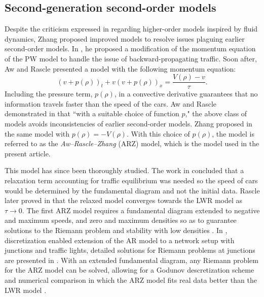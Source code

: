 \documentclass[preprint]{elsarticle}
\begin{document}
\subsection{Second-generation second-order models}
Despite the criticism expressed in \cite{Dag_requiem} regarding higher-order models inspired by fluid dynamics, Zhang proposed improved models to resolve issues plaguing earlier second-order models. In \cite{Zhang1998}, he proposed a modification of the momentum equation of the PW model to handle the issue of backward-propagating traffic.
Soon after, Aw and Rascle \cite{AR} presented a model with the following momentum equation:
\begin{equation} \label{ARZEq}
(v+p(\rho))_t+v(v+p(\rho))_x=\frac{V(\rho)-v}{\tau}.
\end{equation}
Including the pressure term, $p(\rho)$, in a convective derivative guarantees that no information travels faster than the speed of the cars. Aw and Rascle demonstrated in \cite{AR} that ``with a suitable choice of function $p$," the above class of models avoids inconsistencies of earlier second-order models. Zhang proposed in \cite{Z} the same model with $p(\rho) = -V(\rho)$. With this choice of $p(\rho)$, the model is referred to as the \textit{Aw--Rascle--Zhang} (ARZ) model, which is the model used in the present article.

This model has since been thoroughly studied. The work in
\cite{AR} concluded that a relaxation term accounting for traffic
equilibrium was needed so the speed of cars would be determined by
the fundamental diagram and not the initial data. Rascle later proved in \cite{R_improved} that the relaxed model converges towards the LWR model as $\tau \rightarrow 0$. The first ARZ model requires a fundamental diagram extended to negative and maximum speeds, and zero and maximum densities so as to guarantee
solutions to the Riemann problem and stability with low densities \cite{Lebacque2007}. In \cite{HybridLagrangian2007}, 
discretization enabled extension of the AR model to a network setup with junctions and traffic lights, detailed solutions for Riemann problems at junctions are presented in \cite{garavello2006traffic}. With an extended fundamental diagram, any Riemann problem for the ARZ model can be solved, allowing for a Godunov descretization scheme and numerical comparison
in which the ARZ model fits real data better than the LWR model \cite{GodunovARZ}.
\end{document}
